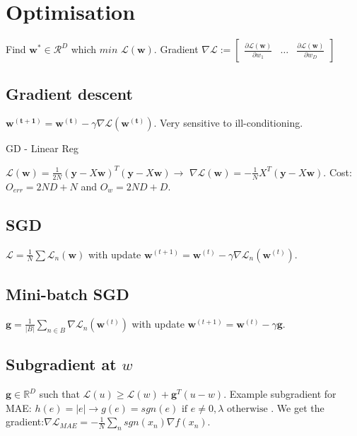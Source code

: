 \section{Optimisation}
Find $\mathbf{w^*} \in \mathcal{R}^D$ which $min\,\,\mathcal{L}(\mathbf{w})$.\newline
Gradient $\nabla \mathcal{L} := \begin{bmatrix} \frac{\partial \mathcal{L}(\mathbf{w})}{\partial w_1} & \dots & \frac{\partial \mathcal{L}(\mathbf{w})}{\partial w_D} \end{bmatrix}$

\subsection{Gradient descent}

$\mathbf{w^{(t+1)}} = \mathbf{w^{(t)}} - \gamma \nabla \mathcal{L}(\mathbf{w^{(t)}})$. Very sensitive to ill-conditioning.

GD - Linear Reg

$\mathcal{L}(\mathbf{w}) = \frac{1}{2N} (\mathbf{y} - X\mathbf{w})^T(\mathbf{y} - X\mathbf{w}) \rightarrow$ \newline $ \nabla \mathcal{L}(\mathbf{w}) = - \frac{1}{N} X^T(\mathbf{y} - X\mathbf{w})$. Cost: \newline $O_{err} = 2ND + N$ and $O_{w} = 2ND + D$.

\subsection{SGD}

$\mathcal{L} = \frac{1}{N} \sum{\mathcal{L}}_n(\mathbf{w})$ with update $\mathbf{w}^{(t+1)} = \mathbf{w}^{(t)} - \gamma \nabla \mathcal{L}_n(\mathbf{w}^{(t)})$.

\subsection{Mini-batch SGD}

$\mathbf{g} = \frac{1}{|B|} \sum_{n\in B}{\nabla \mathcal{L}}_n(\mathbf{w}^{(t)})$ with update $\mathbf{w}^{(t+1)} = \mathbf{w}^{(t)} - \gamma \mathbf{g}$.

\subsection{Subgradient at $w$}

$\mathbf{g} \in \mathbb{R}^D$ such that $\mathcal{L}(u) \ge \mathcal{L}(w) + \mathbf{g}^T (u-w)$. Example subgradient for MAE: $h(e) = |e| \rightarrow g(e) = {sgn(e) \text{ if } e \ne 0, \lambda \text{ otherwise }}$. We get the gradient:\newline $\nabla \mathcal{L}_{MAE} = - \frac{1}{N} \sum_n sgn(x_n) \nabla f(x_n)$.

